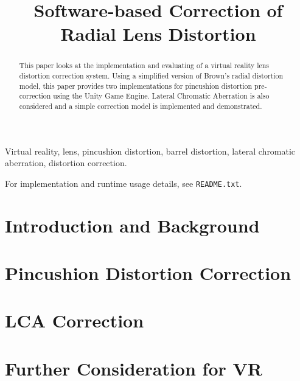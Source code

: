 \documentclass[conference]{IEEEtran}
\begin{document}
    \title{Software-based Correction of Radial Lens Distortion}

    \author{
    }

    \maketitle
    
    \begin{abstract}
        This paper looks at the implementation and evaluating of a virtual reality lens distortion correction system.
        Using a simplified version of Brown's radial distortion model, this paper provides two implementations for pincushion distortion pre-correction using the Unity Game Engine.
        Lateral Chromatic Aberration is also considered and a simple correction model is implemented and demonstrated.
    \end{abstract}
    
    \begin{IEEEkeywords}
        Virtual reality, lens, pincushion distortion, barrel distortion, lateral chromatic aberration, distortion correction.
    \end{IEEEkeywords}

    For implementation and runtime usage details, see \texttt{README.txt}.

    \section{Introduction and Background}\label{sec:introduction}
    

    \section{Pincushion Distortion Correction}\label{sec:pincushion-distortion}
    

    \section{LCA Correction}\label{sec:lca-correction}
    

    \section{Further Consideration for VR}\label{sec:further-consideration}
    

    
    
\end{document}

